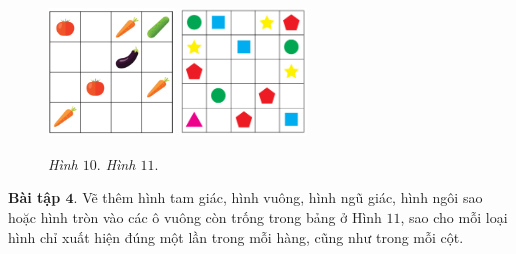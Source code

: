 		\begin{figure}[H]
		\vspace*{-5pt}
		\centering
		\captionsetup{labelformat=empty, justification=centering}
		\includegraphics[width=0.3\textwidth]{hinh11}\hspace{40pt}
		\includegraphics[width=0.3\textwidth]{hinh13}
		
		\caption{\textit{\small Hình $10.$ \hspace*{75pt} Hình $11.$ }}  %
		\vspace*{-10pt}
	\end{figure}
	\textbf{Bài tập $\pmb{4.}$} Vẽ thêm  hình tam giác, hình vuông,  hình ngũ giác, hình ngôi sao hoặc hình tròn vào các ô vuông còn trống trong bảng ở Hình $11$, sao cho mỗi loại hình chỉ xuất hiện đúng một lần trong mỗi hàng, cũng như trong mỗi cột.